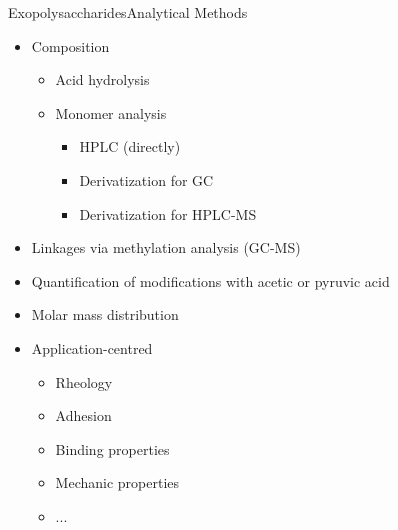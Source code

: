 \documentclass[mathserif]{beamer}
\newcommand{\EPS}{Exopolysaccharide}
\begin{document}
\begin{frame}{\EPS{}s}{Analytical Methods}
	\begin{itemize}
		\item Composition
		\begin{itemize}
			\item Acid hydrolysis
			\item Monomer analysis
			\pause
			\begin{itemize}
				\item HPLC (directly)
				\item Derivatization for GC
				\item \alert{Derivatization for HPLC-MS}
			\end{itemize}
		\end{itemize}
		\pause
		\item Linkages via methylation analysis (GC-MS)
		\pause
		\item Quantification of modifications with acetic or pyruvic acid
		\pause
		\item Molar mass distribution
		\pause
		\item Application-centred
		\begin{itemize}
			\item Rheology
			\item Adhesion
			\item Binding properties
			\item Mechanic properties
			\item ...
		\end{itemize}
	\end{itemize}
\end{frame}
\end{document}
